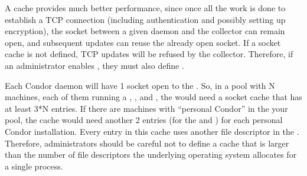A cache provides much better performance, since once all the work is
done to establish a TCP connection (including authentication and
possibly setting up encryption), the socket between a given daemon and
the collector can remain open, and subsequent updates can reuse the
already open socket.
If a socket cache is not defined, TCP updates will be refused by
the collector.
Therefore, if an administrator enables
, they must also define
.

Each Condor daemon will have 1 socket open to the .
So, in a pool with N machines, each of them running a ,
, and , the  would
need a socket cache that has at least 3*N entries.
If there are machines with ``personal Condor'' in the your pool, the
cache would need another 2 entries (for the  and
) for each personal Condor installation.
Every entry in this cache uses another file descriptor in the
.
Therefore, administrators should be careful not to define a cache that
is larger than the number of file descriptors the underlying operating
system allocates for a single process.

